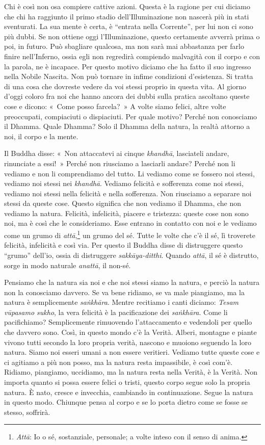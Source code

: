 Chi è così non osa compiere cattive azioni. Questa è la ragione per cui
diciamo che chi ha raggiunto il primo stadio dell'Illuminazione non
nascerà più in stati sventurati. La sua mente è certa, è ``entrata nella
Corrente'', per lui non ci sono più dubbi. Se non ottiene oggi
l'Illuminazione, questo certamente avverrà prima o poi, in futuro. Può
sbagliare qualcosa, ma non sarà mai abbastanza per farlo finire
nell'Inferno, ossia egli non regredirà compiendo malvagità con il corpo
e con la parola, ne è incapace. Per questo motivo diciamo che ha fatto
il suo ingresso nella Nobile Nascita. Non può tornare in infime
condizioni d'esistenza. Si tratta di una cosa che dovreste vedere da voi
stessi proprio in questa vita. Al giorno d'oggi coloro fra noi che hanno
ancora dei dubbi sulla pratica ascoltano queste cose e dicono: «~Come
posso farcela?~» A volte siamo felici, altre volte preoccupati,
compiaciuti o dispiaciuti. Per quale motivo? Perché non conosciamo il
Dhamma. Quale Dhamma? Solo il Dhamma della natura, la realtà attorno a
noi, il corpo e la mente.

Il Buddha disse: «~Non attaccatevi ai cinque \emph{khandhā}, lasciateli
andare, rinunciate a essi!~» Perché non riusciamo a lasciarli andare?
Perché non li vediamo e non li comprendiamo del tutto. Li vediamo come
se fossero noi stessi, vediamo noi stessi nei \emph{khandhā}. Vediamo
felicità e sofferenza come noi stessi, vediamo noi stessi nella felicità
e nella sofferenza. Non riusciamo a separare noi stessi da queste cose.
Questo significa che non vediamo il Dhamma, che non vediamo la natura.
Felicità, infelicità, piacere e tristezza: queste cose non sono noi, ma
è così che le consideriamo. Esse entrano in contatto con noi e le
vediamo come un grumo di \emph{attā},\footnote{\emph{Attā}: Io o sé,
  sostanziale, personale; a volte inteso con il senso di anima.} un
grumo del sé. Tutte le volte che c'è il sé, lì troverete felicità,
infelicità e così via. Per questo il Buddha disse di distruggere questo
``grumo'' dell'io, ossia di distruggere \emph{sakkāya-ditthi}. Quando
\emph{attā}, il sé è distrutto, sorge in modo naturale \emph{anattā}, il
non-sé.

Pensiamo che la natura sia noi e che noi stessi siamo la natura, e
perciò la natura non la conosciamo davvero. Se va bene ridiamo, se va
male piangiamo, ma la natura è semplicemente \emph{saṅkhāra}. Mentre
recitiamo i canti diciamo: \emph{Tesam vūpasamo sukho}, la vera felicità
è la pacificazione dei \emph{saṅkhāra}. Come li pacifichiamo?
Semplicemente rimuovendo l'attaccamento e vedendoli per quello che
davvero sono. Così, in questo mondo c'è la Verità. Alberi, montagne e
piante vivono tutti secondo la loro propria verità, nascono e muoiono
seguendo la loro natura. Siamo noi esseri umani a non essere veritieri.
Vediamo tutte queste cose e ci agitiamo a più non posso, ma la natura
resta impassibile, è così com'è. Ridiamo, piangiamo, uccidiamo, ma la
natura resta nella Verità, è la Verità. Non importa quanto si possa
essere felici o tristi, questo corpo segue solo la propria natura. È
nato, cresce e invecchia, cambiando in continuazione. Segue la natura in
questo modo. Chiunque pensa al corpo e se lo porta dietro come se fosse
se stesso, soffrirà.

